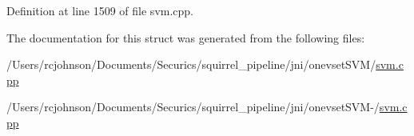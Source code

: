 Definition at line 1509 of file svm.\-cpp.



The documentation for this struct was generated from the following files\-:\begin{DoxyCompactItemize}
\item 
/\-Users/rcjohnson/\-Documents/\-Securics/squirrel\-\_\-pipeline/jni/onevset\-S\-V\-M/\hyperlink{svm_8cpp}{svm.\-cpp}\item 
/\-Users/rcjohnson/\-Documents/\-Securics/squirrel\-\_\-pipeline/jni/onevset\-S\-V\-M-\//\hyperlink{_2svm_8cpp}{svm.\-cpp}\end{DoxyCompactItemize}
